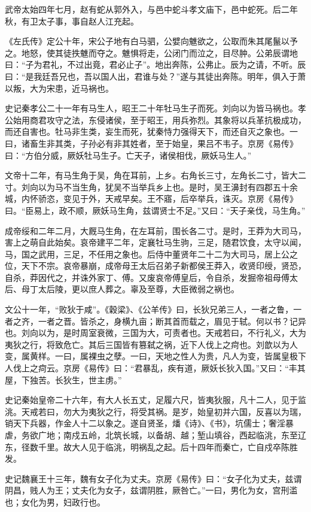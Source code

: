 \documentclass[]{article}
\begin{document}
武帝太始四年七月，赵有蛇从郭外入，与邑中蛇斗孝文庙下，邑中蛇死。后二年秋，有卫太子事，事自赵人江充起。

《左氏传》定公十年，宋公子地有白马驷，公嬖向魋欲之，公取而朱其尾鬣以予之。地怒，使其徒抶魋而夺之。魋惧将走，公闭门而泣之，目尽肿。公弟辰谓地曰：``子为君礼，不过出竟，君必止子''。地出奔陈，公弗止。辰为之请，不听。辰曰：``是我廷吾兄也，吾以国人出，君谁与处？''遂与其徒出奔陈。明年，俱入于萧以叛，大为宋患，近马祸也。

史记秦孝公二十一年有马生人，昭王二十年牡马生子而死。刘向以为皆马祸也。孝公始用商君攻守之法，东侵诸侯，至于昭王，用兵弥烈。其象将以兵革抗极成功，而还自害也。牡马非生类，妄生而死，犹秦恃力强得天下，而还自灭之象也。一曰，诸畜生非其类，子孙必有非其姓者，至于始皇，果吕不韦子。京房《易传》曰：``方伯分威，厥妖牡马生子。亡天子，诸侯相伐，厥妖马生人。''

文帝十二年，有马生角于吴，角在耳前，上乡。右角长三寸，左角长二寸，皆大二寸。刘向以为马不当生角，犹吴不当举兵乡上也。是时，吴王濞封有四郡五十余城，内怀骄恣，变见于外，天戒早矣。王不寤，后卒举兵，诛灭。京房《易传》曰。``臣易上，政不顺，厥妖马生角，兹谓贤士不足。''又曰：``天子亲伐，马生角。''

成帝绥和二年二月，大厩马生角，在左耳前，围长各二寸。是时，王莽为大司马，害上之萌自此始矣。哀帝建平二年，定襄牡马生驹，三足，随君饮食，太守以闻，马，国之武用，三足，不任用之象也。后侍中董贤年二十二为大司马，居上公之位，天下不宗。哀帝暴崩，成帝母王太后召弟子新都侯王莽入，收贤印绶，贤恐，自杀，莽因代之，并诛外家丁、傅。又废哀帝傅皇后，令自杀，发掘帝祖母傅太后、母丁太后陵，更以庶人葬之。辜及至尊，大臣微弱之祸也。

文公十一年，``败狄于咸''。《穀梁》、《公羊传》曰，长狄兄弟三人，一者之鲁，一者之齐，一者之晋。皆杀之，身横九亩；断其首而载之，眉见于轼。何以书？记异也。刘向以为，是时周室衰微，三国为大，可责者也。天戒若曰，不行礼义，大为夷狄之行，将致危亡。其后三国皆有篡弑之祸，近下人伐上之疴也。刘歆以为人变，属黄样。一曰，属裸虫之孽。一曰，天地之性人为贵，凡人为变，皆属皇极下人伐上之疴云。京房《易传》曰：``君暴乱，疾有道，厥妖长狄入国。''又曰：``丰其屋，下独苦。长狄生，世主虏。''

史记秦始皇帝二十六年，有大人长五丈，足履六尺，皆夷狄服，凡十二人，见于监洮。天戒若曰，勿大为夷狄之行，将受其祸。是岁，始皇初并六国，反喜以为瑞，销天下兵器，作金人十二以象之。遂自贤圣，燔《诗》、《书》，坑儒士；奢淫暴虐，务欲广地；南戍五岭，北筑长城，以备胡、越；堑山填谷，西起临洮，东至辽东，径数千里。故大人见于临洮，明祸乱之起。后十四年而秦亡，亡自戍卒陈胜发。

史记魏襄王十三年，魏有女子化为丈夫。京房《易传》曰：``女子化为丈夫，兹谓阴昌，贱人为王；丈夫化为女子，兹谓阴胜，厥咎亡。''一曰，男化为女，宫刑滥也；女化为男，妇政行也。
\end{document}
